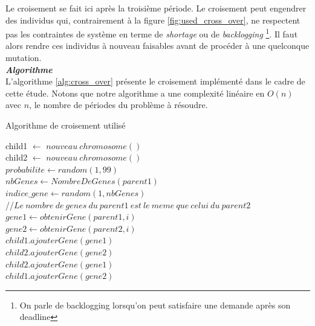		Le croisement se fait ici après la troisième période. Le croisement peut engendrer des individus qui, contrairement à la figure \ref{fig:used_cross_over}, ne respectent pas les contraintes de système en terme de \emph{shortage} ou de \emph{backlogging} \footnote{On parle de backlogging lorsqu'on peut satisfaire une demande après son deadline}. Il faut alors rendre ces individus à nouveau faisables avant de procéder à une quelconque mutation. \\
		\hspace*{.5cm} \textbf{\textsl{Algorithme}}\\L'algorithme \ref{alg:cross_over} présente le croisement implémenté dans le cadre de cette étude. Notons que notre algorithme a une complexité linéaire en $O(n)$ avec $n$, le nombre de périodes du problème à résoudre.\\
		\begin{algorithm}[H]
 		\caption{Algorithme de croisement utilisé}
 		\label{alg:cross_over}
 		\BlankLine
 		child1 $\gets$ $nouveau\ chromosome()$ \\
 		child2 $\gets$ $nouveau\ chromosome()$ \\
 		$probabilite \gets random(1,99)$ \\
 		\BlankLine
 		{
 			$nbGenes \gets NombreDeGenes(parent1)$\\
 			$indice\_gene \gets random(1, nbGenes)$\\
 			//$ Le \ nombre \ de \ genes \ du \ parent1 \ est \ le \ meme \ que \ celui \ du \ parent2 $\\
 			{
 				$gene1 \gets obtenirGene(parent1, i)$ \\
 				$gene2 \gets obtenirGene(parent2, i)$ \\
 				{
 					$child1.ajouterGene(gene1)$ \\
 					$child2.ajouterGene(gene2)$ \\
 				}
 				{
 					$child2.ajouterGene(gene1)$ \\
 					$child1.ajouterGene(gene2)$ \\
 				}
 			}
 		}
		\end{algorithm}
		
